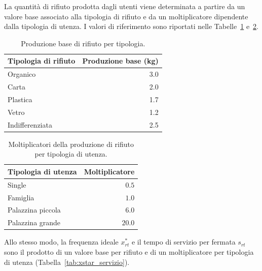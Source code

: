 La quantità di rifiuto prodotta dagli utenti viene determinata a partire da un valore base associato alla tipologia di rifiuto e da un moltiplicatore dipendente dalla tipologia di utenza. I valori di riferimento sono riportati nelle Tabelle~\ref{tab:wbase} e~\ref{tab:moltiplicatori}.

\begin{table}[htbp]
	\centering
	\caption{Produzione base di rifiuto per tipologia.}
	\label{tab:wbase}
	\begin{tabular}{lr}
		\hline
		Tipologia di rifiuto & Produzione base (kg) \\
		\hline
		Organico & 3.0 \\
		Carta & 2.0 \\
		Plastica & 1.7 \\
		Vetro & 1.2 \\
		Indifferenziata & 2.5 \\
		\hline
	\end{tabular}
\end{table}

\begin{table}[htbp]
	\centering
	\caption{Moltiplicatori della produzione di rifiuto per tipologia di utenza.}
	\label{tab:moltiplicatori}
	\begin{tabular}{lr}
		\hline
		Tipologia di utenza & Moltiplicatore \\
		\hline
		Single & $0.5$ \\
		Famiglia & $1.0$ \\
		Palazzina piccola & $6.0$ \\
		Palazzina grande & $20.0$ \\
		\hline
	\end{tabular}
\end{table}

Allo stesso modo, la frequenza ideale $x^*_{rt}$ e il tempo di servizio per fermata $s_{rt}$ sono il prodotto di un valore base per rifiuto e di un moltiplicatore per tipologia di utenza (Tabella~\ref{tab:xstar_servizio}).

